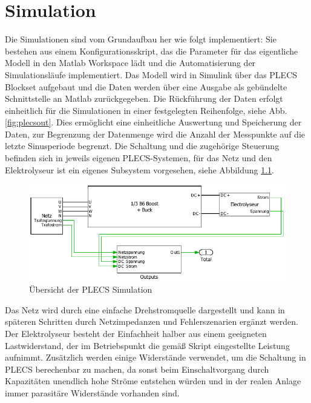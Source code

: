 \chapter{Simulation}
Die Simulationen sind vom Grundaufbau her wie folgt implementiert: Sie bestehen aus einem Konfigurationsskript, das die Parameter für das eigentliche Modell in den Matlab Workspace lädt und die Automatisierung der Simulationsläufe implementiert. Das Modell wird in Simulink über das PLECS Blockset aufgebaut und die Daten werden über eine Ausgabe als gebündelte Schnittstelle an Matlab zurückgegeben. Die Rückführung der Daten erfolgt einheitlich für die Simulationen in einer festgelegten Reihenfolge, siehe Abb. \ref{fig:plecsout}. Dies ermöglicht eine einheitliche Auswertung und Speicherung der Daten, zur Begrenzung der Datenmenge wird die Anzahl der Messpunkte auf die letzte Sinusperiode begrenzt. Die Schaltung und die zugehörige Steuerung befinden sich in jeweils eigenen PLECS-Systemen, für das Netz und den Elektrolyseur ist ein eigenes Subsystem vorgesehen, siehe Abbildung \ref{fig:plecssimulationsaufbau}.  
\begin{figure}[H]
\centering
\includegraphics[width=0.9\linewidth]{content/Grafiken/PLECS_Simulationsaufbau}
\caption{Übersicht der PLECS Simulation}
\label{fig:plecssimulationsaufbau}
\end{figure}
Das Netz wird durch eine einfache Drehstromquelle dargestellt und kann in späteren Schritten durch Netzimpedanzen und Fehlerszenarien ergänzt werden. Der Elektrolyseur besteht der Einfachheit halber aus einem geeigneten Lastwiderstand, der im Betriebspunkt die gemäß Skript eingestellte Leistung aufnimmt. Zusätzlich werden einige Widerstände verwendet, um die Schaltung in \gls{PLECS} berechenbar zu machen, da sonst beim Einschaltvorgang durch Kapazitäten unendlich hohe Ströme entstehen würden und in der realen Anlage immer parasitäre Widerstände vorhanden sind.
